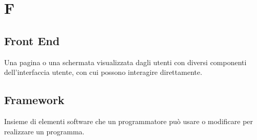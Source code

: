\chapter{F}

\section{Front End}\label{sec:Front-end}
Una pagina o una schermata visualizzata dagli utenti con diversi componenti dell'interfaccia utente, con cui possono interagire direttamente.

\section{Framework}\label{sec:Frameworks}
Insieme di elementi software che un programmatore può usare o modificare per realizzare un programma.

